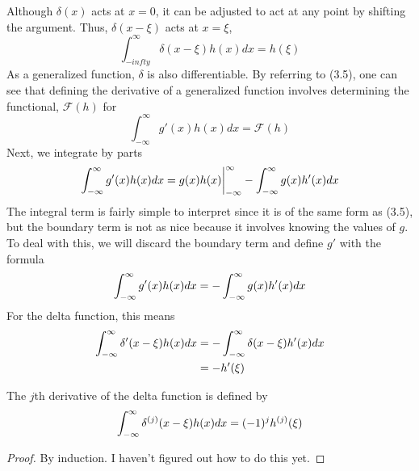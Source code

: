 Although \(\delta(x)\) acts at \(x=0\), it can be adjusted to act at any point by shifting the argument. Thus, \(\delta(x-\xi)\) acts at \(x=\xi\),
\begin{equation}
    \int_{-infty}^{\infty} \delta(x-\xi)h(x)dx = h(\xi)
\end{equation}
As a generalized function, \(\delta\) is also differentiable. By referring to (3.5), one can see that defining the derivative of a generalized function involves determining the functional, \(\mathcal{F}(h)\) for
\begin{equation}
    \int_{-\infty}^{\infty} g'(x)h(x) dx= \mathcal{F}(h)
\end{equation}
Next, we integrate by parts
\begin{equation}
    \int_{-\infty}^{\infty} g'(x)h(x)dx = g(x)h(x)\biggr\rvert_{-\infty}^{\infty} - \int_{-\infty}^{\infty} g(x)h'(x)dx
\end{equation}
The integral term is fairly simple to interpret since it is of the same form as (3.5), but the boundary term is not as nice because it involves knowing the values of \(g\). To deal with this, we will discard the boundary term and define \(g'\) with the formula
\begin{equation}
    \int_{-\infty}^{\infty} g'(x)h(x)dx = -\int_{-\infty}^{\infty} g(x)h'(x)dx
\end{equation}
For the delta function, this means
\begin{equation}
    \begin{split}
        \int_{-\infty}^{\infty} \delta'(x-\xi)h(x)dx &= -\int_{-\infty}^{\infty}\delta(x-\xi)h'(x)dx\\
        &=-h'(\xi)
    \end{split}
\end{equation}


\begin{theorem}
    The \(j\)th derivative of the delta function is defined by
    \begin{equation}
         \int_{-\infty}^{\infty} \delta^{(j)}(x-\xi)h(x)dx = (-1)^jh^{(j)}(\xi)
    \end{equation}
\end{theorem}
\begin{proof}
    By induction. I haven't figured out how to do this yet.
\end{proof}

